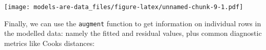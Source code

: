 \documentclass[]{article}
\newenvironment{Shaded}{\begin{snugshade}}{\end{snugshade}}
\newcommand{\DataTypeTok}[1]{\textcolor[rgb]{0.13,0.29,0.53}{#1}}
\newcommand{\FloatTok}[1]{\textcolor[rgb]{0.00,0.00,0.81}{#1}}
\newcommand{\KeywordTok}[1]{\textcolor[rgb]{0.13,0.29,0.53}{\textbf{#1}}}
\newcommand{\NormalTok}[1]{#1}
\newcommand{\OperatorTok}[1]{\textcolor[rgb]{0.81,0.36,0.00}{\textbf{#1}}}
\newcommand{\OtherTok}[1]{\textcolor[rgb]{0.56,0.35,0.01}{#1}}
\newcommand{\StringTok}[1]{\textcolor[rgb]{0.31,0.60,0.02}{#1}}
\begin{document}
\texttt{[image: models-are-data\_files/figure-latex/unnamed-chunk-9-1.pdf]}

Finally, we can use the \texttt{augment} function to get information on individual rows
in the modelled data: namely the fitted and residual values, plus common
diagnostic metrics like Cooks distances:

\begin{Shaded}
\end{Shaded}
\end{document}

